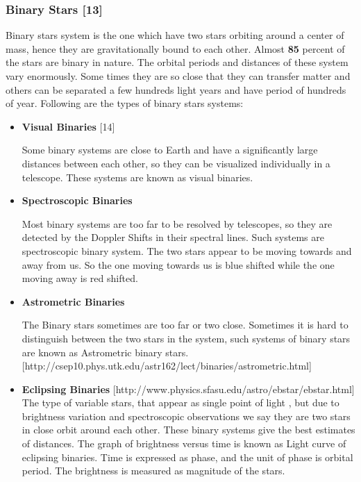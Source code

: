 \documentclass{article}
\begin{document}
\subsubsection*{Binary Stars [13]}
Binary stars system is the one which have two stars orbiting around a center of mass, hence they are gravitationally bound to each other. Almost \textbf{85} percent of the stars are binary in nature. The orbital periods and distances of these system vary enormously. Some times they are so close that they can transfer matter and others can be separated a few hundreds light years and have period of hundreds of year. Following are the types of binary stars systems:
\begin{itemize}
\item \textbf{Visual Binaries} [14]

  Some binary systems are close to Earth and have a significantly large distances between each    other, so they can be visualized individually in a telescope. These systems are known as visual binaries. 
\item \textbf{Spectroscopic Binaries }

Most binary systems are too far to be resolved by telescopes, so they are detected by the Doppler Shifts in their spectral lines. Such systems are spectroscopic binary system. The two stars appear to be moving towards and away from us. So the one moving towards us is blue shifted while the one moving away is red shifted.


\item\textbf{ Astrometric Binaries}

The Binary stars sometimes are too far or two close. Sometimes it is hard to distinguish between the two stars in the system, such systems of binary stars are known as Astrometric binary stars.
[http://csep10.phys.utk.edu/astr162/lect/binaries/astrometric.html]

\item \textbf{Eclipsing Binaries}
[http://www.physics.sfasu.edu/astro/ebstar/ebstar.html]
The type of variable stars, that appear as single point of light , but due to brightness variation and spectroscopic observations we say they are two stars in close orbit around each other. 
These binary systems give the best estimates of distances.
The graph of brightness versus time is known as Light curve of eclipsing binaries. Time is expressed as phase, and the unit of phase is orbital period. The brightness is measured as magnitude of the stars. 


\end{itemize}
\end{document}

